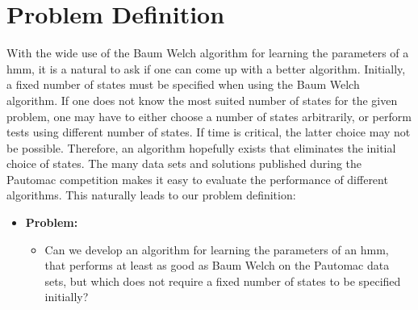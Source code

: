 \section{Problem Definition}

With the wide use of the Baum Welch algorithm for learning the parameters of a \gls{hmm}, it is a natural to ask if one can come up with a better algorithm. Initially, a fixed number of states must be specified when using the Baum Welch algorithm.
If one does not know the most suited number of states for the given problem, one may have to either choose a number of states arbitrarily, or perform tests using different number of states. If time is critical, the latter choice may not be possible. Therefore, an algorithm hopefully exists that eliminates the initial choice of states.
The many data sets and solutions published during the Pautomac competition makes it easy to evaluate the performance of different algorithms.
This naturally leads to our problem definition:



\begin{itemize}
\item \textbf{Problem:}
	\begin{itemize}
	\item Can we develop an algorithm for learning the parameters of an \gls{hmm}, that performs at least as good as Baum Welch on the Pautomac data sets, but which does not require a fixed number of states to be specified initially?
	\end{itemize}
\end{itemize}